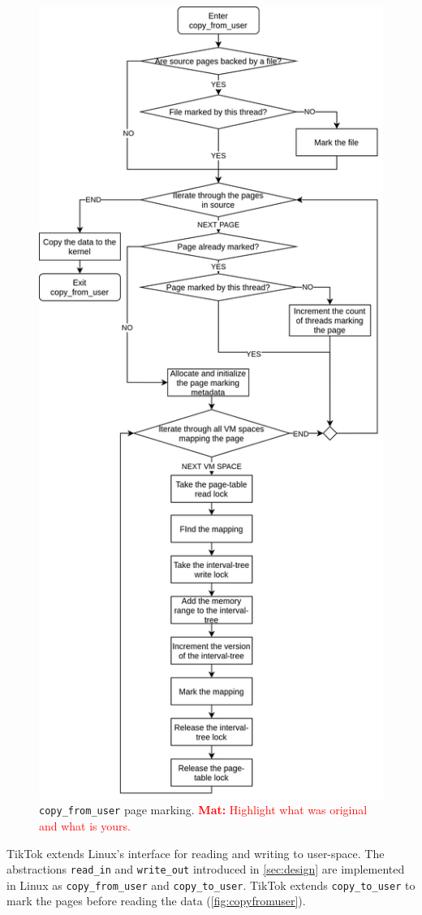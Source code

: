 \documentclass[conference]{IEEEtran}
\newcommand{\mat}[1]{\textcolor{red}{\textbf{Mat:} #1}}
\newcommand{\sysname}{TikTok}
\begin{document}
\begin{figure}[]
  \centering
  \includegraphics[width = 0.8\linewidth]{img/copy_from_user.png}
  \caption{\texttt{copy\_from\_user} page marking.
\mat{Highlight what was original and what is yours.}
}
  \label{fig:copyfromuser}
\end{figure}

\sysname{} extends Linux's interface for reading and writing to user-space. The
abstractions \texttt{read\_in} and \texttt{write\_out} introduced in
\autoref{sec:design} are implemented in Linux as \texttt{copy\_from\_user} and
\texttt{copy\_to\_user}. \sysname{} extends \texttt{copy\_to\_user} to mark the pages
before reading the data (\autoref{fig:copyfromuser}).
\end{document}
